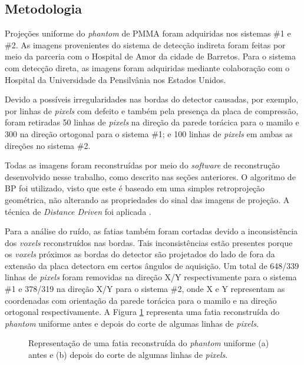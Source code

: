 \subsection{Metodologia} \label{Metodologia}

Projeções uniforme do \textit{phantom} de \acs{PMMA} foram adquiridas nos sistemas \#1 e \#2. As imagens provenientes do sistema de detecção indireta foram feitas por meio da parceria com o Hospital de Amor da cidade de Barretos. Para o sistema com detecção direta, as imagens foram adquiridas mediante colaboração com o Hospital da Universidade da Pensilvânia nos Estados Unidos. 

Devido a possíveis irregularidades nas bordas do detector causadas, por exemplo, por linhas de \textit{pixels} com defeito e também pela presença da placa de compressão, foram retiradas 50 linhas de \textit{pixels} na direção da parede torácica para o mamilo e 300 na direção ortogonal para o sistema \#1; e 100 linhas de \textit{pixels} em ambas as direções no sistema \#2.

Todas as imagens foram reconstruídas por meio do \textit{software} de reconstrução desenvolvido nesse trabalho, como descrito nas seções anteriores. O algoritmo de \acs{BP} foi utilizado, visto que este é baseado em uma simples retroprojeção geométrica, não alterando as propriedades do sinal das imagens de projeção. A técnica de \textit{Distance Driven} foi aplicada \cite{de2004distance}. 

Para a análise do ruído, as fatias também foram cortadas devido a inconsistência dos \textit{voxels} reconstruídos nas bordas. Tais inconsistências estão presentes porque os \textit{voxels} próximos as bordas do detector são projetados do lado de fora da extensão da placa detectora em certos ângulos de aquisição. Um total de 648/339 linhas de \textit{pixels} foram removidas na direção X/Y respectivamente para o sistema \#1 e 378/319 na direção X/Y para o sistema \#2, onde X e Y representam as coordenadas com orientação da parede torácica para o mamilo e na direção ortogonal respectivamente. A Figura \ref{fig:imgCap4ReconUniform} representa uma fatia reconstruída do \textit{phantom} uniforme antes e depois do corte de algumas linhas de \textit{pixels}.

\begin{figure}[htb]
	\centering	
	\caption{Representação de uma fatia reconstruída do \textit{phantom} uniforme (a) antes e (b) depois do corte de algumas linhas de \textit{pixels}.}
	
	\hfill
	
	\label{fig:imgCap4ReconUniform}
\end{figure}

